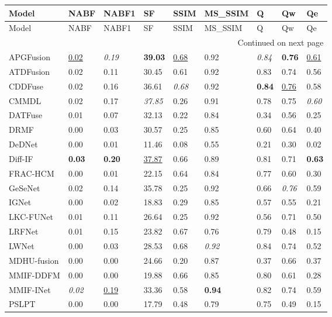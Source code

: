 {\small
\begin{longtable}{lllllllll}
\toprule
Model & NABF & NABF1 & SF & SSIM & MS_SSIM & Q & Qw & Qe \\
\midrule
\endfirsthead
\toprule
Model & NABF & NABF1 & SF & SSIM & MS_SSIM & Q & Qw & Qe \\
\midrule
\endhead
\midrule
\multicolumn{9}{r}{Continued on next page} \\
\midrule
\endfoot
\bottomrule
\endlastfoot
APGFusion & \underline{0.02} & \textit{0.19} & \textbf{39.03} & \underline{0.68} & 0.92 & \textit{0.84} & \textbf{0.76} & \underline{0.61} \\
ATDFusion & 0.02 & 0.11 & 30.45 & 0.61 & 0.92 & 0.83 & 0.74 & 0.56 \\
CDDFuse & 0.02 & 0.16 & 36.61 & \textit{0.68} & 0.92 & \textbf{0.84} & \underline{0.76} & 0.58 \\
CMMDL & 0.02 & 0.17 & \textit{37.85} & 0.26 & 0.91 & 0.78 & 0.75 & \textit{0.60} \\
DATFuse & 0.01 & 0.07 & 32.13 & 0.22 & 0.84 & 0.34 & 0.56 & 0.25 \\
DRMF & 0.00 & 0.03 & 30.57 & 0.25 & 0.85 & 0.60 & 0.64 & 0.40 \\
DeDNet & 0.00 & 0.01 & 11.46 & 0.08 & 0.55 & 0.21 & 0.30 & 0.02 \\
Diff-IF & \textbf{0.03} & \textbf{0.20} & \underline{37.87} & 0.66 & 0.89 & 0.81 & 0.71 & \textbf{0.63} \\
FRAC-HCM & 0.00 & 0.01 & 22.15 & 0.64 & 0.84 & 0.77 & 0.60 & 0.30 \\
GeSeNet & 0.02 & 0.14 & 35.78 & 0.25 & 0.92 & 0.66 & \textit{0.76} & 0.59 \\
IGNet & 0.00 & 0.02 & 18.83 & 0.29 & 0.85 & 0.57 & 0.55 & 0.21 \\
LKC-FUNet & 0.01 & 0.11 & 26.64 & 0.25 & 0.92 & 0.56 & 0.71 & 0.50 \\
LRFNet & 0.01 & 0.15 & 23.82 & 0.67 & 0.76 & 0.79 & 0.48 & 0.15 \\
LWNet & 0.00 & 0.03 & 28.53 & 0.68 & \textit{0.92} & 0.84 & 0.74 & 0.52 \\
MDHU-fusion & 0.00 & 0.00 & 24.66 & 0.20 & 0.87 & 0.37 & 0.66 & 0.37 \\
MMIF-DDFM & 0.00 & 0.00 & 19.88 & 0.66 & 0.85 & 0.80 & 0.61 & 0.28 \\
MMIF-INet & \textit{0.02} & \underline{0.19} & 33.36 & 0.58 & \textbf{0.94} & 0.82 & 0.74 & 0.59 \\
PSLPT & 0.00 & 0.00 & 17.79 & 0.48 & 0.79 & 0.75 & 0.49 & 0.15 \\

\end{longtable}}
